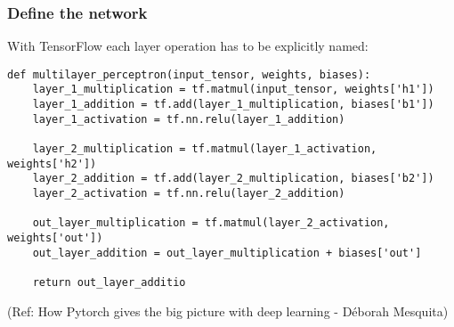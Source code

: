 



\begin{frame}[fragile] \frametitle{Define the network}
 With TensorFlow each layer operation has to be explicitly named:

 \begin{lstlisting}
def multilayer_perceptron(input_tensor, weights, biases):
    layer_1_multiplication = tf.matmul(input_tensor, weights['h1'])
    layer_1_addition = tf.add(layer_1_multiplication, biases['b1'])
    layer_1_activation = tf.nn.relu(layer_1_addition)
    
    layer_2_multiplication = tf.matmul(layer_1_activation, weights['h2'])
    layer_2_addition = tf.add(layer_2_multiplication, biases['b2'])
    layer_2_activation = tf.nn.relu(layer_2_addition)
    
    out_layer_multiplication = tf.matmul(layer_2_activation, weights['out'])
    out_layer_addition = out_layer_multiplication + biases['out']
    
    return out_layer_additio
\end{lstlisting}

  {\tiny (Ref: How Pytorch gives the big picture with deep learning - Déborah Mesquita)}
\end{frame}


